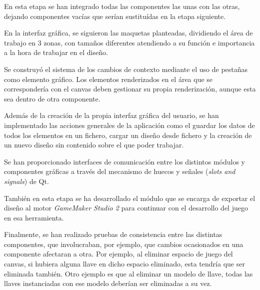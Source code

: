 En esta etapa se han integrado todas las componentes las unas con las otras, dejando componentes vacías que serían sustituídas en la etapa siguiente.

En la interfaz gráfica, se siguieron las maquetas planteadas, dividiendo el área de trabajo en 3 zonas, con tamaños diferentes atendiendo a su función e importancia a la hora de trabajar en el diseño.

Se construyó el sistema de los cambios de contexto mediante el uso de pestañas como elemento gráfico. Los elementos renderizados en el área que se correspondería con el canvas deben gestionar su propia renderización, aunque esta sea dentro de otra componente.

Además de la creación de la propia interfaz gráfica del usuario, se han implementado las acciones generales de la aplicación como el guardar los datos de todos los elementos en un fichero, cargar un diseño desde fichero y la creación de un nuevo diseño sin contenido sobre el que poder trabajar.

Se han proporcionado interfaces de comunicación entre los distintos módulos y componentes gráficas a través del mecanismo de huecos y señales (\textit{slots and signals}) de Qt.

También en esta etapa se ha desarrollado el módulo que se encarga de exportar el diseño al motor \textit{GameMaker Studio 2} para continuar con el desarrollo del juego en esa herramienta.

Finalmente, se han realizado pruebas de consistencia entre las distintas componentes, que involucraban, por ejemplo, que cambios ocasionados en una componente afectaran a otra. Por ejemplo, al eliminar espacio de juego del canvas, si hubiera alguna llave en dicho espacio eliminado, esta tendría que ser eliminada también. Otro ejemplo es que al eliminar un modelo de llave, todas las llaves instanciadas con ese modelo deberían ser eliminadas a su vez.